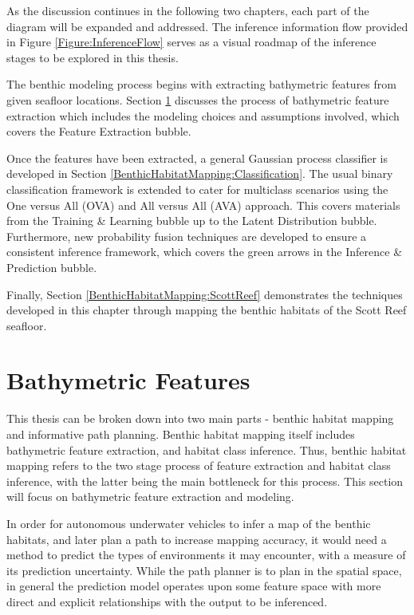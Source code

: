 	As the discussion continues in the following two chapters, each part of the diagram will be expanded and addressed. The inference information flow provided in Figure \ref{Figure:InferenceFlow} serves as a visual roadmap of the inference stages to be explored in this thesis.
		
	The benthic modeling process begins with extracting bathymetric features from given seafloor locations. Section \ref{BenthicHabitatMapping:BathymetricFeatures} discusses the process of bathymetric feature extraction which includes the modeling choices and assumptions involved, which covers the {\color{BurntOrange} Feature Extraction} bubble. 
	
	Once the features have been extracted, a general Gaussian process classifier is developed in Section \ref{BenthicHabitatMapping:Classification}. The usual binary classification framework is extended to cater for multiclass scenarios using the One versus All (OVA) and All versus All (AVA) approach. This covers materials from the {\color{Cyan} Training \& Learning} bubble up to the {\color{Orchid} Latent Distribution} bubble. Furthermore, new probability fusion techniques are developed to ensure a consistent inference framework, which covers the {\color{ForestGreen} green} arrows in the {\color{ForestGreen} Inference \& Prediction} bubble.
	
	Finally, Section \ref{BenthicHabitatMapping:ScottReef} demonstrates the techniques developed in this chapter through mapping the benthic habitats of the Scott Reef seafloor. 
		
	\section{Bathymetric Features}
	\label{BenthicHabitatMapping:BathymetricFeatures}
	
		This thesis can be broken down into two main parts - benthic habitat mapping and informative path planning. Benthic habitat mapping itself includes bathymetric feature extraction, and habitat class inference. Thus, benthic habitat mapping refers to the two stage process of feature extraction and habitat class inference, with the latter being the main bottleneck for this process. This section will focus on bathymetric feature extraction and modeling.
			
		In order for autonomous underwater vehicles to infer a map of the benthic habitats, and later plan a path to increase mapping accuracy, it would need a method to predict the types of environments it may encounter, with a measure of its prediction uncertainty. While the path planner is to plan in the spatial space, in general the prediction model operates upon some feature space with more direct and explicit relationships with the output to be inferenced.
		
